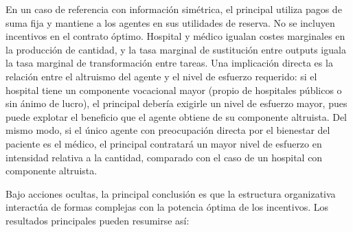 En un caso de referencia con información simétrica, el principal utiliza pagos de suma fija y mantiene a los agentes en sus utilidades de reserva. No se incluyen incentivos en el contrato óptimo. Hospital y médico igualan costes marginales en la producción de cantidad, y la tasa marginal de sustitución entre outputs iguala la tasa marginal de transformación entre tareas. Una implicación directa es la relación entre el altruismo del agente y el nivel de esfuerzo requerido: si el hospital tiene un componente vocacional mayor (propio de hospitales públicos o sin ánimo de lucro), el principal debería exigirle un nivel de esfuerzo mayor, pues puede explotar el beneficio que el agente obtiene de su componente altruista. Del mismo modo, si el único agente con preocupación directa por el bienestar del paciente es el médico, el principal contratará un mayor nivel de esfuerzo en intensidad relativa a la cantidad, comparado con el caso de un hospital con componente altruista.

Bajo acciones ocultas, la principal conclusión es que la estructura organizativa interactúa de formas complejas con la potencia óptima de los incentivos. Los resultados principales pueden resumirse así:


